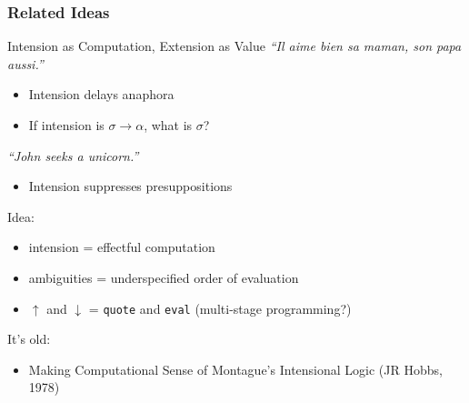 \documentclass{beamer}
\begin{document}
\begin{frame}
  \frametitle{Related Ideas}

  \begin{block}{Intension as Computation, Extension as Value}
    \textit{``Il aime bien sa maman, son papa aussi.''}
    \begin{itemize}
    \item Intension delays anaphora
    \item If intension is $\sigma \to \alpha$, what is $\sigma$?
    \end{itemize}
    \textit{``John seeks a unicorn.''}
    \begin{itemize}
    \item Intension suppresses presuppositions
    \end{itemize}

    \vfill

    Idea:
    \begin{itemize}
    \item intension = effectful computation
    \item ambiguities = underspecified order of evaluation
    \item $\uparrow$ and $\downarrow$ = \texttt{quote} and \texttt{eval}
      (multi-stage programming?)
    \end{itemize}

    It's old:
    \begin{itemize}
    \item Making Computational Sense of Montague's Intensional Logic (JR
      Hobbs, 1978)
    \end{itemize}
  \end{block}
\end{frame}

\setcounter{framenumber}{\value{finalframe}}
\end{document}
